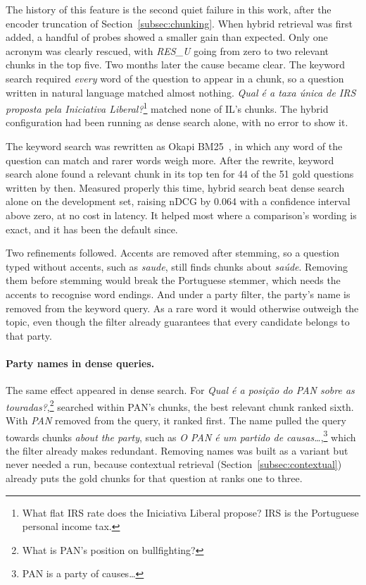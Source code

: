 The history of this feature is the second quiet failure in this work, after
the encoder truncation of Section~\ref{subsec:chunking}. When hybrid retrieval
was first added, a handful of probes showed a smaller gain than expected. Only
one acronym was clearly rescued, with \textit{RES\_U} going from zero to two
relevant chunks in the top five. Two months later the cause became clear. The
keyword search required \emph{every} word of the question to appear in a
chunk, so a question written in natural language matched almost nothing.
\textit{Qual é a taxa única de IRS proposta pela Iniciativa Liberal?}\footnote{What
flat IRS rate does the Iniciativa Liberal propose? IRS is the Portuguese
personal income tax.} matched none of IL's
chunks. The hybrid configuration had been running as dense search alone, with
no error to show it.

The keyword search was rewritten as Okapi BM25~\citep{robertson2009bm25}, in
which any word of the question can match and rarer words weigh more. After the
rewrite, keyword search alone found a relevant chunk in its top ten for 44 of
the 51 gold questions written by then. Measured properly this time, hybrid
search beat dense search alone on the development set, raising nDCG by 0.064
with a confidence interval above zero, at no cost in latency. It helped most
where a comparison's wording is exact, and it has been the default since.

Two refinements followed. Accents are removed after stemming, so a question
typed without accents, such as \textit{saude}, still finds chunks about
\textit{saúde}. Removing them before stemming would break the Portuguese
stemmer, which needs the accents to recognise word endings. And under a party
filter, the party's name is removed from the keyword query. As a rare word it
would otherwise outweigh the topic, even though the filter already guarantees
that every candidate belongs to that party.

\paragraph{Party names in dense queries.} The same effect appeared in dense
search. For \textit{Qual é a posição do PAN sobre as touradas?},\footnote{What is PAN's
position on bullfighting?} searched within PAN's chunks, the best relevant
chunk ranked sixth. With \textit{PAN} removed from the query, it ranked first.
The name pulled the query towards chunks \emph{about the party}, such as
\textit{O PAN é um partido de causas\ldots},\footnote{PAN is a party of
causes\ldots} which the filter already makes
redundant. Removing names was built as a variant but never needed a run,
because contextual retrieval (Section~\ref{subsec:contextual}) already puts
the gold chunks for that question at ranks one to three.

